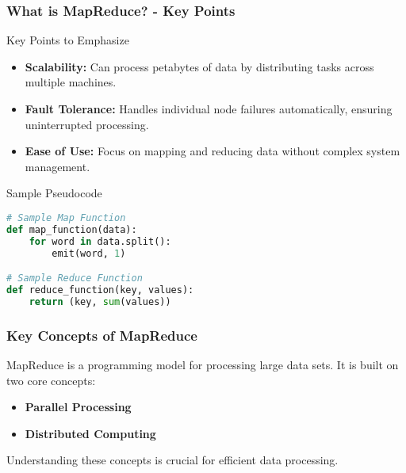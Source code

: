 \documentclass[aspectratio=169]{beamer}
\begin{document}
\begin{frame}[fragile]
  \frametitle{What is MapReduce? - Key Points}
  \begin{block}{Key Points to Emphasize}
    \begin{itemize}
      \item \textbf{Scalability:} Can process petabytes of data by distributing tasks across multiple machines.
      \item \textbf{Fault Tolerance:} Handles individual node failures automatically, ensuring uninterrupted processing.
      \item \textbf{Ease of Use:} Focus on mapping and reducing data without complex system management.
    \end{itemize}
  \end{block}
  
  \begin{block}{Sample Pseudocode}
  \begin{lstlisting}[language=Python]
# Sample Map Function
def map_function(data):
    for word in data.split():
        emit(word, 1)

# Sample Reduce Function
def reduce_function(key, values):
    return (key, sum(values))
  \end{lstlisting}
  \end{block}
\end{frame}

\begin{frame}[fragile]
    \frametitle{Key Concepts of MapReduce}
    MapReduce is a programming model for processing large data sets. It is built on two core concepts:
    \begin{itemize}
        \item \textbf{Parallel Processing}
        \item \textbf{Distributed Computing}
    \end{itemize}
    Understanding these concepts is crucial for efficient data processing.
\end{frame}
\end{document}
